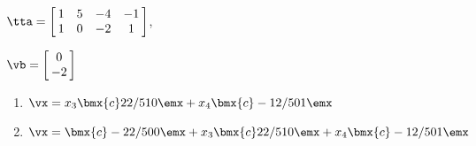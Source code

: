 {$\tta = \left[\hskip -3pt \begin{array}{cccc} 1&5&-4&-1\\  1&0&-2&1
\end{array}\hskip -3pt \right] $, 

$\vb=\left[\hskip -3pt \begin{array}{c} 0\\  -2\end{array}\hskip -3pt \right] $}
{\begin{enumerate}
\item	 $\vx=x_3\bmx{c}2\\2/5\\1\\0\emx+x_4\bmx{c}-1\\2/5\\0\\1\emx$

\item	$\vx=\bmx{c}-2\\2/5\\0\\0\emx + x_3\bmx{c}2\\2/5\\1\\0\emx +x_4\bmx{c}-1\\2/5\\0\\1\emx$
\end{enumerate}}

 
 









